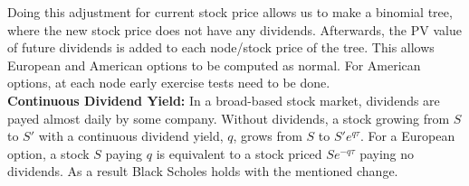 \documentclass[12pt]{article}
\begin{document}
Doing this adjustment for current stock price allows us to make a binomial tree, where the new stock price does not have any dividends. Afterwards, the PV value of future dividends is added to each node/stock price of the tree. This allows European and American options to be computed as normal. For American options, at each node early exercise tests need to be done. 
\\

    \textbf{Continuous Dividend Yield:} In a broad-based stock market, dividends are payed almost daily by some company. Without dividends, a stock growing from $S$ to $S'$ with a continuous dividend yield, $q$, grows from $S$ to $S'e^{q\tau}$.
    For a European option, a stock $S$ paying $q$ is equivalent to a stock priced $Se^{-q\tau}$ paying no dividends. As a result Black Scholes holds with the mentioned change.

    \clearpage
  
\end{document}
